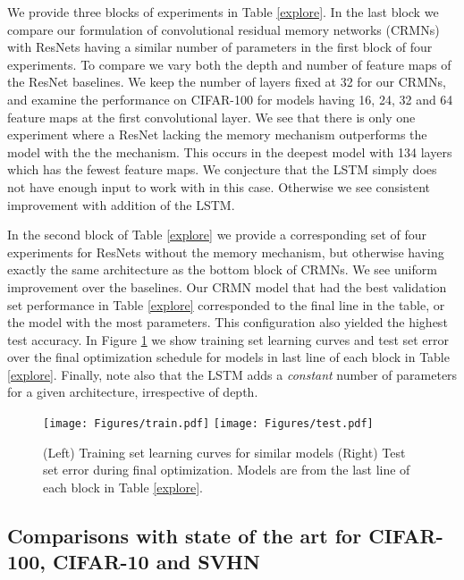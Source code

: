 \documentclass{article}
\begin{document}
We provide three blocks of experiments in Table \ref{explore}. In the last block
we compare our formulation of convolutional residual memory networks (CRMNs) with ResNets having a similar number of parameters in the first block of four experiments. To compare we vary both the depth and number of feature maps of the ResNet baselines. We keep the number of layers fixed at 32 for our CRMNs, and examine the performance on CIFAR-100 for models having 16, 24, 32 and 64 feature maps at the first convolutional layer.  We see that there is only one experiment where a ResNet lacking the memory mechanism outperforms the model with the the mechanism. This occurs in the deepest model with 134 layers which has the fewest feature maps. We conjecture that the LSTM simply does not have enough input to work with in this case. Otherwise we see consistent improvement with addition of the LSTM.  

In the second block of Table \ref{explore} we provide a corresponding set of four experiments for ResNets without the memory mechanism, but otherwise having exactly the same architecture as the bottom block of CRMNs. We see uniform improvement over the baselines.
%
Our CRMN model that had the best validation set performance in Table \ref{explore} corresponded to the final line in the table, or the model with the most parameters. This configuration also yielded the highest test accuracy. 
%
In Figure \ref{fig:curves} we show training set learning curves and test set error over the final optimization schedule for models in last line of each block in Table \ref{explore}. 
%
Finally, note also that the LSTM adds a \emph{constant} number of parameters for a given architecture, irrespective of depth. 

\begin{figure}[htbp]
  \centering
    \texttt{[image: Figures/train.pdf]} \hspace{.2cm}
     \texttt{[image: Figures/test.pdf]}
  \caption[Learning Curves]{(Left) Training set learning curves for similar models (Right) Test set error during final optimization. Models are from the last line of each block in Table \ref{explore}.}
  \label{fig:curves}
\end{figure}

\subsection{Comparisons with state of the art for CIFAR-100, CIFAR-10 and SVHN}
\end{document}
